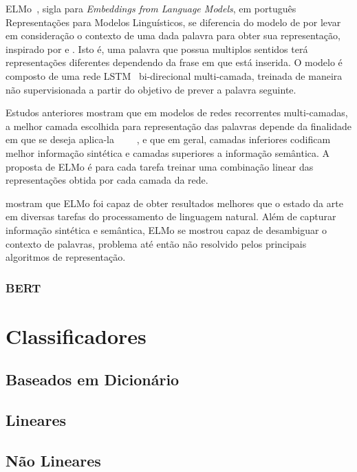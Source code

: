 ELMo~\cite{peters18}, sigla para \textit{Embeddings from Language Models}, em
português Representações para Modelos Linguísticos, se diferencia do modelo de
\citet{cho14} por levar em consideração o contexto de uma dada palavra para
obter sua representação, inspirado por \citet{peters17} e \citet{mccann17}.
Isto é, uma palavra que possua multiplos sentidos terá representações diferentes
dependendo da frase em que está inserida.
O modelo é composto de uma rede LSTM~\cite{hochreiter97} bi-direcional
multi-camada, treinada de maneira não supervisionada a partir do objetivo de
prever a palavra seguinte.

Estudos anteriores mostram que em modelos de redes recorrentes multi-camadas,
a melhor camada escolhida para representação das palavras depende da finalidade
em que se deseja aplica-la
~\cite{hashimoto16}~\cite{sogaard16}~\cite{belinkov17}~\cite{melamud16}, e que
em geral, camadas inferiores codificam melhor informação sintética e camadas
superiores a informação semântica.
A proposta de ELMo é para cada tarefa treinar uma combinação linear das
representações obtida por cada camada da rede.


\citet{peters18} mostram que ELMo foi capaz de obter resultados melhores que o
estado da arte em diversas tarefas do processamento de linguagem natural.
Além de capturar informação sintética e semântica, ELMo se mostrou capaz de
desambiguar o contexto de palavras, problema até então não resolvido pelos
principais algoritmos de representação.

\subsubsection{BERT}

\section{Classificadores}
\subsection{Baseados em Dicionário} \label{sec:dictionary}
\subsection{Lineares}
\subsection{Não Lineares}
